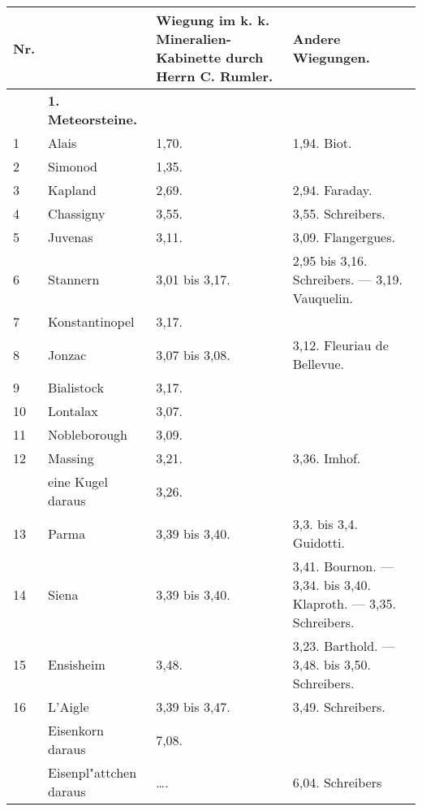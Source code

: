 \documentclass[a4paper, 11pt, oneside, polutonikogreek, german]{article}
\begin{document}
\section{}
\begin{center}
    \begin{longtable}{|p{7mm}|p{32mm}|p{30mm}|p{30mm}|}
    \hline
        Nr. & ~  & Wiegung im k. k. Mineralien-Kabinette durch Herrn C. Rumler. & Andere Wiegungen. \\ \hline
         ~ & \textbf{1. Meteorsteine.} & ~  & ~  \\ \hline
        1 & Alais & 1,70. & 1,94. Biot. \\ \hline
        2 & Simonod & 1,35. &   \\ \hline
        3 & Kapland & 2,69. & 2,94. Faraday. \\ \hline
        4 & Chassigny & 3,55. & 3,55. Schreibers. \\ \hline
        5 & Juvenas & 3,11. & 3,09. Flangergues. \\ \hline
        6 & Stannern & 3,01 bis 3,17. & 2,95 bis 3,16. Schreibers. --- 3,19. Vauquelin. \\ \hline
        7 & Konstantinopel & 3,17. &   \\ \hline
        8 & Jonzac & 3,07 bis 3,08. & 3,12. Fleuriau de Bellevue. \\ \hline
        9 & Bialistock & 3,17. &   \\ \hline
        10 & Lontalax & 3,07. &   \\ \hline
        11 & Nobleborough & 3,09. &   \\ \hline
        12 & Massing & 3,21. & 3,36. Imhof. \\ \hline
          & eine Kugel daraus & 3,26. &   \\ \hline
        13 & Parma & 3,39 bis 3,40. & 3,3. bis 3,4. Guidotti. \\ \hline
        14 & Siena & 3,39 bis 3,40. & 3,41. Bournon. --- 3,34. bis 3,40. Klaproth. --- 3,35. Schreibers. \\ \hline
        15 & Ensisheim & 3,48. & 3,23. Barthold. --- 3,48. bis 3,50. Schreibers. \\ \hline
        16 & L’Aigle & 3,39 bis 3,47. & 3,49. Schreibers. \\ \hline
          & Eisenkorn daraus & 7,08. &   \\ \hline
          & Eisenpl"attchen daraus & …. & 6,04. Schreibers \\ \hline

\end{longtable}
\end{center}
\end{document}
